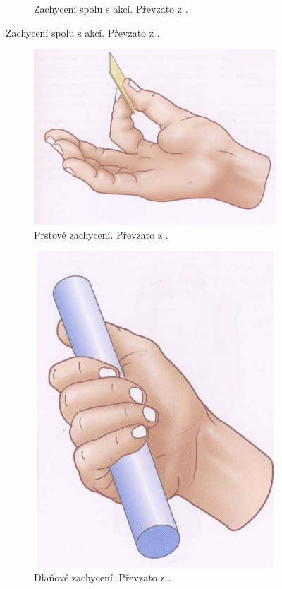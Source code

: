 \documentclass[thesis=B,czech]{FITthesis}[2012/06/26]
\begin{document}
\begin{figure}[H]
\begin{subfigure}{.3\textwidth}
  \caption{Zachycení spolu s akcí. Převzato z \cite{PhysJoin}.}
  \label{fig:actionGrip}
\end{subfigure}
\label{fig:test}

\end{figure}
 

 \begin{figure}[H]
\centering
\begin{subfigure}{.4\textwidth}
  \centering
  \includegraphics[width=.6\linewidth]{./image/fingGrip.png}
  \caption{Prstové zachycení. Převzato z \cite{PhysJoin}.}
  \label{fig:fingGrip}
\end{subfigure}
\begin{subfigure}{.4\textwidth}
  \centering
  \includegraphics[width=.6\linewidth]{./image/dlanGrip.png}
  \caption{Dlaňové zachycení. Převzato z \cite{PhysJoin}.}
  \label{fig:dlanGrip}
\end{subfigure}
\label{fig:test}
\begin{subfigure}{.4\textwidth}
  \centering

\end{subfigure}
\end{figure}
\end{document}
